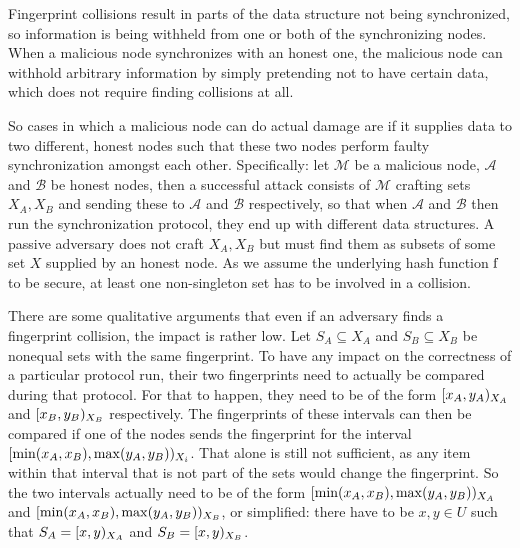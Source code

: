 Fingerprint collisions result in parts of the data structure not being synchronized, so information is being withheld from one or both of the synchronizing nodes. When a malicious node synchronizes with an honest one, the malicious node can withhold arbitrary information by simply pretending not to have certain data, which does not require finding collisions at all.

So cases in which a malicious node can do actual damage are if it supplies data to two different, honest nodes such that these two nodes perform faulty synchronization amongst each other. Specifically: let $\mathcal{M}$ be a malicious node, $\mathcal{A}$ and $\mathcal{B}$ be honest nodes, then a successful attack consists of $\mathcal{M}$ crafting sets $X_A, X_B$ and sending these to $\mathcal{A}$ and $\mathcal{B}$ respectively, so that when $\mathcal{A}$ and $\mathcal{B}$ then run the synchronization protocol, they end up with different data structures. A passive adversary does not craft $X_A, X_B$ but must find them as subsets of some set $X$ supplied by an honest node. As we assume the underlying hash function $\operatorname{f}$ to be secure, at least one non-singleton set has to be involved in a collision.

There are some qualitative arguments that even if an adversary finds a fingerprint collision, the impact is rather low. Let $S_A \subseteq X_A$ and $S_B \subseteq X_B$ be nonequal sets with the same fingerprint. To have any impact on the correctness of a particular protocol run, their two fingerprints need to actually be compared during that protocol. For that to happen, they need to be of the form $[{x_A},{y_A})_{X_A}$ and $[{x_B},{y_B})_{X_B}$ respectively. The fingerprints of these intervals can then be compared if one of the nodes sends the fingerprint for the interval $[{\min(x_A, x_B)},{\max(y_A, y_B)})_{X_i}$. That alone is still not sufficient, as any item within that interval that is not part of the sets would change the fingerprint. So the two intervals actually need to be of the form $[{\min(x_A, x_B)},{\max(y_A, y_B)})_{X_A}$ and $[{\min(x_A, x_B)},{\max(y_A, y_B)})_{X_B}$, or simplified: there have to be $x, y \in U$ such that $S_A = [{x},{y})_{X_A}$ and $S_B = [{x},{y})_{X_B}$.

